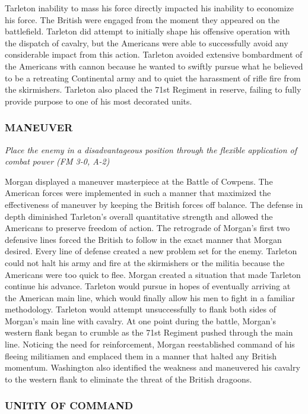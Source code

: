Tarleton inability to mass his force directly impacted his inability to
economize his force.  The British were engaged from the moment they appeared on
the battlefield.  Tarleton did attempt to initially shape his offensive
operation with the dispatch of cavalry, but the Americans were able to
successfully avoid any considerable impact from this action.  Tarleton avoided
extensive bombardment of the Americans with cannon because he wanted to swiftly
pursue what he believed to be a retreating Continental army and to quiet the
harassment of rifle fire from the skirmishers.  Tarleton also placed the 71st
Regiment in reserve, failing to fully provide purpose to one of his most
decorated units.    

\subsubsection{MANEUVER}

\textit{Place the enemy in a disadvantageous position through the flexible
application of combat power (FM 3-0, A-2)}

Morgan displayed a maneuver masterpiece at the Battle of Cowpens.  The American
forces were implemented in such a manner that maximized the effectiveness of
maneuver by keeping the British forces off balance.  The defense in depth
diminished Tarleton’s overall quantitative strength and allowed the Americans
to preserve freedom of action.  The retrograde of Morgan’s first two defensive
lines forced the British to follow in the exact manner that Morgan desired.
Every line of defense created a new problem set for the enemy.  Tarleton could
not halt his army and fire at the skirmishers or the militia because the
Americans were too quick to flee.  Morgan created a situation that made
Tarleton continue his advance.  Tarleton would pursue in hopes of eventually
arriving at the American main line, which would finally allow his men to fight
in a familiar methodology.   Tarleton would attempt unsuccessfully to flank
both sides of Morgan’s main line with cavalry.  At one point during the battle,
Morgan’s western flank began to crumble as the 71st Regiment pushed through the
main line.  Noticing the need for reinforcement, Morgan reestablished command
of his fleeing militiamen and emplaced them in a manner that halted any British
momentum.  Washington also identified the weakness and maneuvered his cavalry
to the western flank to eliminate the threat of the British dragoons.  

\subsubsection{UNITIY OF COMMAND}

